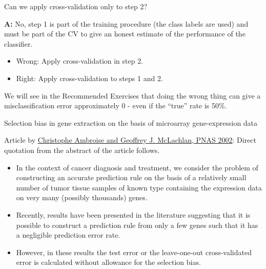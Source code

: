 \documentclass[10pt,ignorenonframetext,]{beamer}
\providecommand{\tightlist}{%
  \setlength{\itemsep}{0pt}\setlength{\parskip}{0pt}}
\begin{document}
\begin{frame}

Can we apply cross-validation only to step 2?

\textbf{A:} No, step 1 is part of the training procedure (the class
labels are used) and must be part of the CV to give an honest estimate
of the performance of the classifier.

\begin{itemize}
\tightlist
\item
  Wrong: Apply cross-validation in step 2.
\item
  Right: Apply cross-validation to steps 1 and 2.
\end{itemize}

We will see in the Recommended Exercises that doing the wrong thing can
give a misclassification error approximately 0 - even if the ``true''
rate is 50\%.

\end{frame}

\begin{frame}

\begin{block}{Selection bias in gene extraction on the basis of
microarray gene-expression data}

Article by \href{http://www.pnas.org/content/99/10/6562}{Christophe
Ambroise and Geoffrey J. McLachlan, PNAS 2002}: Direct quotation from
the abstract of the article follows.

\begin{itemize}
\tightlist
\item
  In the context of cancer diagnosis and treatment, we consider the
  problem of constructing an accurate prediction rule on the basis of a
  relatively small number of tumor tissue samples of known type
  containing the expression data on very many (possibly thousands)
  genes.
\item
  Recently, results have been presented in the literature suggesting
  that it is possible to construct a prediction rule from only a few
  genes such that it has a negligible prediction error rate.
\item
  However, in these results the test error or the leave-one-out
  cross-validated error is calculated without allowance for the
  selection bias.
\end{itemize}

\end{block}

\end{frame}
\end{document}
